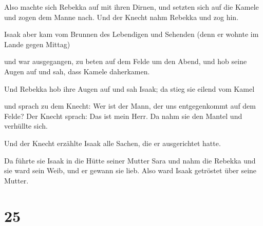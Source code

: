  Also machte sich Rebekka auf mit ihren Dirnen, und setzten
sich auf die Kamele und zogen dem Manne nach. Und der Knecht nahm
Rebekka und zog hin.

 Isaak aber kam vom Brunnen des Lebendigen und Sehenden
(denn er wohnte im Lande gegen Mittag)

 und war ausgegangen, zu beten auf dem Felde um den Abend,
und hob seine Augen auf und sah, dass Kamele daherkamen.

 Und Rebekka hob ihre Augen auf und sah Isaak; da stieg sie
eilend vom Kamel

 und sprach zu dem Knecht: Wer ist der Mann, der uns
entgegenkommt auf dem Felde? Der Knecht sprach: Das ist mein Herr. Da
nahm sie den Mantel und verhüllte sich.

 Und der Knecht erzählte Isaak alle Sachen, die er
ausgerichtet hatte.

 Da führte sie Isaak in die Hütte seiner Mutter Sara und
nahm die Rebekka und sie ward sein Weib, und er gewann sie lieb. Also
ward Isaak getröstet über seine Mutter.

\hypertarget{section-4}{%
\section{25}\label{section-4}}

